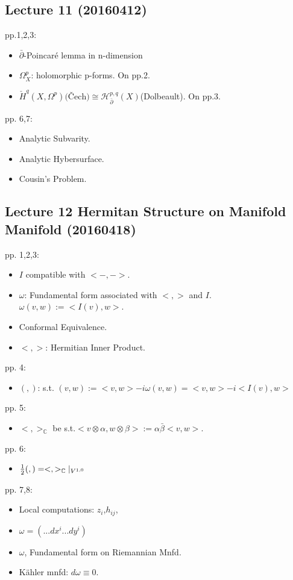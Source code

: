 \documentclass{article}
\numberwithin{equation}{subsection} %
\begin{document}
	\subsection{Lecture 11 (20160412)}
	pp.1,2,3: 
	\begin{itemize}
		\item $\bar{\partial}$-Poincaré lemma in n-dimension
		\item $\Omega_X^p$: holomorphic p-forms. On pp.2.
		\item $\check{H}^q(X,\Omega^p)\text{(Čech)}\cong \mathcal{H}_{\bar{\partial}}^{p,q}(X)$(Dolbeault). On pp.3.
	\end{itemize}
	pp. 6,7:
	\begin{itemize}
		\item Analytic Subvarity.
		\item Analytic Hybersurface.
		\item Cousin's Problem.
	\end{itemize}
	
	\subsection{Lecture 12 Hermitan Structure on Manifold  Manifold (20160418)}
	pp. 1,2,3:
	\begin{itemize}
		\item $I$ compatible with $<-,->$.
		\item $\omega$: Fundamental form associated with $<,>$ and $I$. $\omega(v,w):= <I(v),w>$.
		\item Conformal Equivalence.
		\item $<,>$: Hermitian Inner Product.
	\end{itemize}
	pp. 4:
	\begin{itemize}
		\item $( , )$: s.t. $(v,w):=<v,w>-i\omega(v,w) = <v,w> - i <I(v),w>$
	\end{itemize}
	pp. 5:
	\begin{itemize}
		\item $<,>_{\mathbb{C}}$ be s.t.$<v\otimes \alpha, w\otimes \beta>:= \alpha \bar{\beta} <v,w>$.
	\end{itemize}
	pp. 6:
	\begin{itemize}
		\item $\frac{1}{2}(,) = <,>_{\mathbb{C}} \arrowvert_{V^{1,0}}$
	\end{itemize}
	pp. 7,8:
	\begin{itemize}
		\item Local computations: $z_i$,$h_{ij}$,
		\item $\omega = (...dx^i...dy^i)$
		\item $\omega$, Fundamental form on Riemannian Mnfd.
		\item Kähler mnfd: $d\omega \equiv 0$.
	\end{itemize}
	
\end{document}
